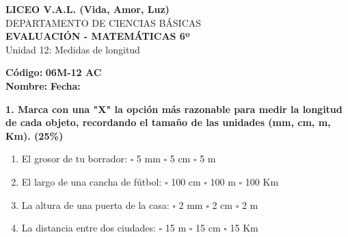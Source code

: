 \documentclass[12pt, letterpaper]{article}
\begin{document}
	
	\begin{center}
		{\Large \textbf{LICEO V.A.L. (Vida, Amor, Luz)}}\\[0.1cm]
		{\large DEPARTAMENTO DE CIENCIAS BÁSICAS}\\[0.1cm]
		\textbf{EVALUACIÓN - MATEMÁTICAS 6º}\\[0.1cm]
		Unidad 12: Medidas de longitud
	\end{center}
	
	
	\hfill \textbf{Código:} \textbf{06M-12 AC}\\
	
	\noindent \textbf{Nombre:} \underline{\hspace{8cm}} \hspace{1cm}\textbf{Fecha:} \underline{\hspace{3cm}}
	
	\vspace{0.6cm}
	
	\noindent \textbf{1. Marca con una "X" la opción más razonable para medir la longitud de cada objeto, recordando el tamaño de las unidades (mm, cm, m, Km). (25\%)}
	
	\vspace{0.4cm}
	\begin{enumerate}[label=\alph*), itemsep=0.4cm]
		\item El grosor de tu borrador: \hspace{0.5cm} $\square$ 5 mm \hspace{0.5cm} $\square$ 5 cm \hspace{0.5cm} $\square$ 5 m
		\item El largo de una cancha de fútbol: \hspace{0.5cm} $\square$ 100 cm \hspace{0.5cm} $\square$ 100 m \hspace{0.5cm} $\square$ 100 Km
		\item La altura de una puerta de la casa: \hspace{0.4cm} $\square$ 2 mm \hspace{0.5cm} $\square$ 2 cm \hspace{0.5cm} $\square$ 2 m
		\item La distancia entre dos ciudades: \hspace{0.7cm} $\square$ 15 m \hspace{0.7cm} $\square$ 15 cm \hspace{0.5cm} $\square$ 15 Km
	\end{enumerate}
	
\end{document}
